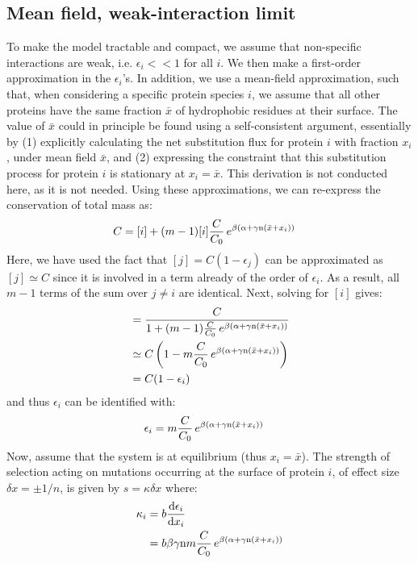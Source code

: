 \subsection{Mean field, weak-interaction limit}
To make the model tractable and compact, we assume that non-specific interactions are weak, i.e. $\epsilon_i << 1$ for all $i$. We then make a first-order approximation in the $\epsilon_i$'s. In addition, we use a mean-field approximation, such that, when considering a specific protein species $i$, we assume that all other proteins have the same fraction $\bar x$ of hydrophobic residues at their surface. The value of $\bar x$ could in principle be found using a self-consistent argument, essentially by (1) explicitly calculating the net \gls{substitution} flux for protein $i$ with fraction $x_i$, under mean field $\bar x$, and (2) expressing the constraint that this \gls{substitution} process for protein $i$ is stationary at $x_i = \bar x$. This derivation is not conducted here, as it is not needed.
Using these approximations, we can re-express the conservation of total mass as:
\begin{align}
C & = [i] + (m-1) [i] \frac{C}{C_0} \, e^{\beta (\alpha + \gamma \text{n} (\bar x + x_i))}
\end{align}
Here, we have used the fact that $[j] = C(1 - \epsilon_j)$ can be approximated as $[j] \simeq C$ since it is involved in a term already of the order of $\epsilon_i$. As a result, all $m-1$ terms of the sum over $j\neq i$ are identical.
Next, solving for $[i]$ gives:
\begin{align}
[i] & = \frac{C} {1 + (m-1) \frac{C}{C_0} \, e^{\beta (\alpha + \gamma \Nsite (\bar x + x_i))}}
\\ & \simeq C \left( 1 - m \frac{C}{C_0} \, e^{\beta (\alpha + \gamma \Nsite (\bar x + x_i))} \right)
\\ & =
C (1 - \epsilon_i)
\end{align}
and thus $\epsilon_i$ can be identified with:
\begin{align}
\epsilon_i  & = m \frac{C}{C_0} \, e^{\beta (\alpha +\gamma \text{n} (\bar x + x_i))}
\end{align}
Now, assume that the system is at equilibrium (thus $x_i = \bar x$). The strength of selection acting on mutations occurring at the surface of protein $i$, of effect size $\delta x = \pm 1/n$, is given by $s = \kappa \delta x$ where:
\begin{align}
\kappa_i & = b \frac{\mathrm{d}\epsilon_i} {\mathrm{d} x_i} 
\\ & =
b \beta \gamma \text{n} m \frac{C}{C_0} \, e^{\beta (\alpha +\gamma \text{n} (\bar x + x_i))}
\end{align}
